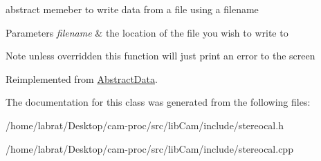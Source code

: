 abstract memeber to write data from a file using a filename 


\begin{DoxyParams}{Parameters}
{\em filename} & the location of the file you wish to write to \\
\hline
\end{DoxyParams}
\begin{DoxyNote}{Note}
unless overridden this function will just print an error to the screen 
\end{DoxyNote}


Reimplemented from \hyperlink{classAbstractData_a338dce47a9901032fd7b908a1c6df514}{Abstract\+Data}.



The documentation for this class was generated from the following files\+:\begin{DoxyCompactItemize}
\item 
/home/labrat/\+Desktop/cam-\/proc/src/lib\+Cam/include/stereocal.\+h\item 
/home/labrat/\+Desktop/cam-\/proc/src/lib\+Cam/include/stereocal.\+cpp\end{DoxyCompactItemize}
